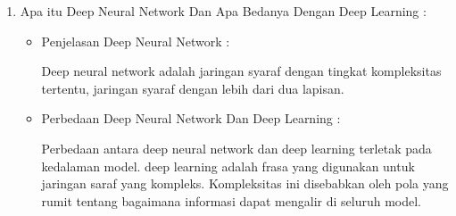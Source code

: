 \begin{enumerate}
\item Apa itu Deep Neural Network Dan Apa Bedanya Dengan Deep Learning :
\begin{itemize}
\item Penjelasan Deep Neural Network : 
\par  Deep neural network adalah jaringan syaraf dengan tingkat kompleksitas tertentu, jaringan syaraf dengan lebih dari dua lapisan.
\par
\item Perbedaan Deep Neural Network Dan Deep Learning :
\par Perbedaan antara deep neural network dan deep learning terletak pada kedalaman model. deep learning adalah frasa yang digunakan untuk jaringan saraf yang kompleks. Kompleksitas ini disebabkan oleh pola yang rumit tentang bagaimana informasi dapat mengalir di seluruh model.
\end{itemize}
\par
\par

\end{enumerate}